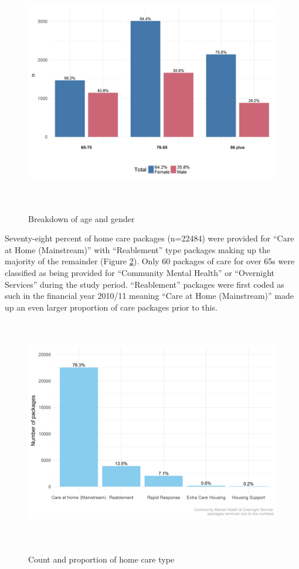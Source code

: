 \documentclass[]{article}
\begin{document}
\begin{figure}[h]
  \centering
    \caption{Breakdown of age and gender}
    \includegraphics[height = 10cm, width = 12cm]{figures/chapter-renf/01-age-gender-ts-subset.png}
    \label{fig:ren-age-gen}
\end{figure}

Seventy-eight percent of home care packages (n=22484) were provided for
``Care at Home (Mainstream)'' with ``Reablement'' type packages making
up the majority of the remainder (Figure \ref{fig:ren-type}). Only 60
packages of care for over 65s were classified as being provided for
``Community Mental Health'' or ``Overnight Services'' during the study
period. ``Reablement'' packages were first coded as such in the
financial year 2010/11 meaning ``Care at Home (Mainstream)'' made up an
even larger proportion of care packages prior to this.

\begin{figure}[]
  \centering
    \caption{Count and proportion of home care type}
    \includegraphics[height = 10cm, width = 12cm]{figures/chapter-renf/03-pack-plot}
    \label{fig:ren-type}
\end{figure}
\end{document}
